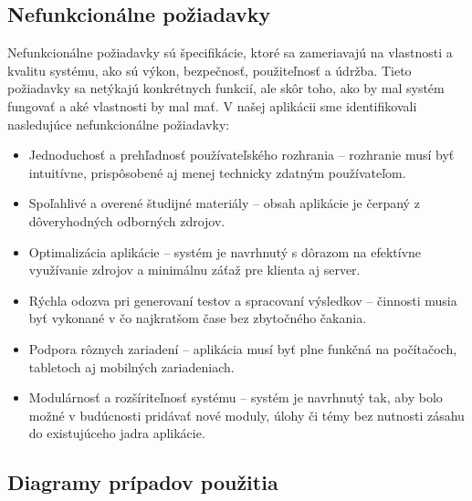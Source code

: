 \subsection{Nefunkcionálne požiadavky}
Nefunkcionálne požiadavky sú špecifikácie, ktoré sa zameriavajú na vlastnosti a kvalitu systému, ako sú výkon, bezpečnosť, použiteľnosť a údržba.
 Tieto požiadavky sa netýkajú konkrétnych funkcií, ale skôr toho, ako by mal systém fungovať a aké vlastnosti by mal mať. 
 V našej aplikácii sme identifikovali nasledujúce nefunkcionálne požiadavky:
 \begin{itemize} 
    \item Jednoduchosť a prehľadnosť používateľského rozhrania – rozhranie musí byť intuitívne, prispôsobené aj menej technicky zdatným používateľom. 
    \item Spoľahlivé a overené študijné materiály – obsah aplikácie je čerpaný z dôveryhodných odborných zdrojov.
    \item Optimalizácia aplikácie – systém je navrhnutý s dôrazom na efektívne využívanie zdrojov a minimálnu záťaž pre klienta aj server.
    \item Rýchla odozva pri generovaní testov a spracovaní výsledkov – činnosti musia byť vykonané v čo najkratšom čase bez zbytočného čakania.
    \item Podpora rôznych zariadení – aplikácia musí byť plne funkčná na počítačoch, tabletoch aj mobilných zariadeniach. 
    \item Modulárnosť a rozšíriteľnosť systému – systém je navrhnutý tak, aby bolo možné v budúcnosti pridávať nové moduly, úlohy či témy bez nutnosti zásahu do existujúceho jadra aplikácie. 
  \end{itemize}


 \subsection{Diagramy prípadov použitia}
